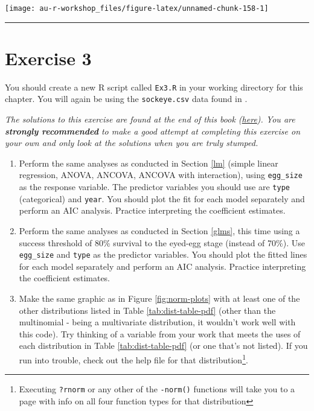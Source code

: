 \documentclass[]{book}
\providecommand{\tightlist}{%
  \setlength{\itemsep}{0pt}\setlength{\parskip}{0pt}}
\let\rmarkdownfootnote\footnote%
\def\footnote{\protect\rmarkdownfootnote}
\theoremstyle{definition}
\theoremstyle{definition}
\theoremstyle{definition}
\theoremstyle{remark}
\begin{document}
\begin{center}\texttt{[image: au-r-workshop\_files/figure-latex/unnamed-chunk-158-1]} \end{center}

\begin{center}\rule{0.5\linewidth}{\linethickness}\end{center}

\section*{Exercise 3}\label{exercise-3}

You should create a new R script called \texttt{Ex3.R} in your working
directory for this chapter. You will again be using the
\texttt{sockeye.csv} data found in \citet{sockeye-cite}.

\emph{The solutions to this exercise are found at the end of this book
(\protect\hyperlink{ex3-answers}{here}). You are \textbf{strongly
recommended} to make a good attempt at completing this exercise on your
own and only look at the solutions when you are truly stumped.}

\begin{enumerate}
\def\labelenumi{\arabic{enumi}.}
\tightlist
\item
  Perform the same analyses as conducted in Section \ref{lm} (simple
  linear regression, ANOVA, ANCOVA, ANCOVA with interaction), using
  \texttt{egg\_size} as the response variable. The predictor variables
  you should use are \texttt{type} (categorical) and \texttt{year}. You
  should plot the fit for each model separately and perform an AIC
  analysis. Practice interpreting the coefficient estimates.
\item
  Perform the same analyses as conducted in Section \ref{glms}, this
  time using a success threshold of 80\% survival to the eyed-egg stage
  (instead of 70\%). Use \texttt{egg\_size} and \texttt{type} as the
  predictor variables. You should plot the fitted lines for each model
  separately and perform an AIC analysis. Practice interpreting the
  coefficient estimates.
\item
  Make the same graphic as in Figure \ref{fig:norm-plots} with at least
  one of the other distributions listed in Table
  \ref{tab:dist-table-pdf} (other than the multinomial - being a
  multivariate distribution, it wouldn't work well with this code). Try
  thinking of a variable from your work that meets the uses of each
  distribution in Table \ref{tab:dist-table-pdf} (or one that's not
  listed). If you run into trouble, check out the help file for that
  distribution\footnote{Executing \texttt{?rnorm} or any other of the
    \texttt{-norm()} functions will take you to a page with info on all
    four function types for that distribution}.
\end{enumerate}
\end{document}
